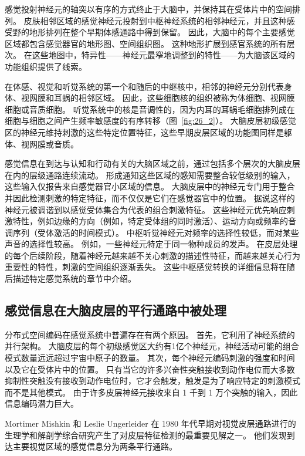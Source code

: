 感觉投射神经元的轴突以有序的方式终止于大脑中，并保持其在受体片中的空间排列。 
皮肤相邻区域的感觉神经元投射到中枢神经系统的相邻神经元，并且这种感受野的地形排列在整个早期体感通路中得到保留。 
因此，大脑中的每个主要感觉区域都包含感觉器官的地形图、空间组织图。 
这种地形扩展到感官系统的所有层次。 
在这些地图中，特异性——神经元最窄地调整到的特性——为大脑该区域的功能组织提供了线索。


在体感、视觉和听觉系统的第一个和随后的中继核中，相邻的神经元分别代表身体、视网膜和耳蜗的相邻区域。 
因此，这些细胞核的组织被称为体细胞、视网膜细胞或音质细胞。 
听觉系统中的核是音调性的，因为内耳的耳蜗毛细胞排列成在细胞与细胞之间产生频率敏感度的有序转移（图~\ref{fig:26_2}）。 
大脑皮层初级感觉区的神经元维持刺激的这些特定位置特征，这些早期皮层区域的功能图同样是躯体、视网膜或音质。


感觉信息在到达与认知和行动有关的大脑区域之前，通过包括多个层次的大脑皮层在内的层级通路连续流动。
形成通知这些区域的感知需要整合较低级别的输入，这些输入仅报告来自感觉器官小区域的信息。
大脑皮层中的神经元专门用于整合并因此检测刺激的特定特征，而不仅仅是它们在感觉器官中的位置。
据说这样的神经元被调谐到以感觉受体集合为代表的组合刺激特征。
这些神经元优先响应刺激特性，例如边缘的方向（例如，特定受体组的同时激活）、运动方向或频率的音调序列（受体激活的时间模式）。
中枢听觉神经元对频率的选择性较低，而对某些声音的选择性较高。
例如，一些神经元特定于同一物种成员的发声。
在皮层处理的每个后续阶段，随着神经元越来越不关心刺激的描述性特征，而越来越关心行为重要性的特性，刺激的空间组织逐渐丢失。
这些中枢感觉转换的详细信息将在随后描述特定感觉系统的章节中介绍。



\subsection{感觉信息在大脑皮层的平行通路中被处理}

分布式空间编码在感觉系统中普遍存在有两个原因。 
首先，它利用了神经系统的并行架构。 
大脑皮层的每个初级感觉区大约有1亿个神经元，神经活动可能的组合模式数量远远超过宇宙中原子的数量。 
其次，每个神经元编码刺激的强度和时间以及它在受体片中的位置。 
只有当它的许多兴奋性突触接收到动作电位而大多数抑制性突触没有接收到动作电位时，它才会触发，触发是为了响应特定的刺激模式而不是其他模式。 
由于许多皮层神经元接收来自 1 千到 1 万个突触的输入，因此信息编码潜力巨大。


Mortimer Mishkin 和 Leslie Ungerleider 在 1980 年代早期对视觉皮层通路进行的生理学和解剖学综合研究产生了对皮层特征检测的最重要见解之一。 
他们发现到达主要视觉区域的感觉信息分为两条平行通路。


